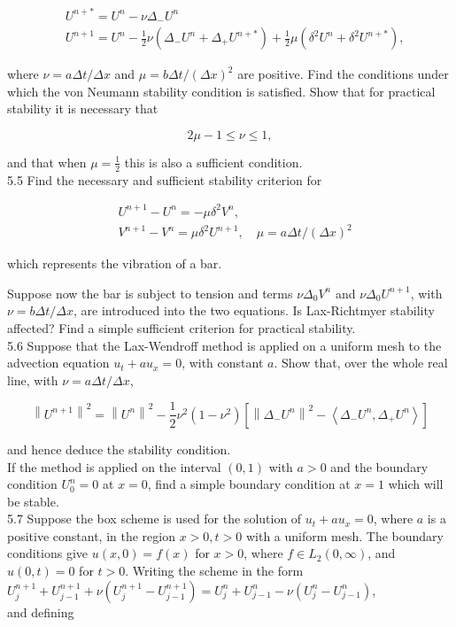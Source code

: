 \documentclass[10pt]{article}
\begin{document}
\[
\begin{aligned}
& U^{n+*}=U^{n}-\nu \Delta_{-} U^{n} \\
& U^{n+1}=U^{n}-\frac{1}{2} \nu\left(\Delta_{-} U^{n}+\Delta_{+} U^{n+*}\right)+\frac{1}{2} \mu\left(\delta^{2} U^{n}+\delta^{2} U^{n+*}\right),
\end{aligned}
\]

where \(\nu=a \Delta t / \Delta x\) and \(\mu=b \Delta t /(\Delta x)^{2}\) are positive. Find the conditions under which the von Neumann stability condition is satisfied. Show that for practical stability it is necessary that

\[
2 \mu-1 \leq \nu \leq 1,
\]

and that when \(\mu=\frac{1}{2}\) this is also a sufficient condition.\\
5.5 Find the necessary and sufficient stability criterion for

\[
\begin{aligned}
& U^{n+1}-U^{n}=-\mu \delta^{2} V^{n}, \\
& V^{n+1}-V^{n}=\mu \delta^{2} U^{n+1}, \quad \mu=a \Delta t /(\Delta x)^{2}
\end{aligned}
\]

which represents the vibration of a bar.

Suppose now the bar is subject to tension and terms \(\nu \Delta_{0} V^{n}\) and \(\nu \Delta_{0} U^{n+1}\), with \(\nu=b \Delta t / \Delta x\), are introduced into the two equations. Is Lax-Richtmyer stability affected? Find a simple sufficient criterion for practical stability.\\
5.6 Suppose that the Lax-Wendroff method is applied on a uniform mesh to the advection equation \(u_{t}+a u_{x}=0\), with constant \(a\). Show that, over the whole real line, with \(\nu=a \Delta t / \Delta x\),

\[
\left\|U^{n+1}\right\|^{2}=\left\|U^{n}\right\|^{2}-\frac{1}{2} \nu^{2}\left(1-\nu^{2}\right)\left[\left\|\Delta_{-} U^{n}\right\|^{2}-\left\langle\Delta_{-} U^{n}, \Delta_{+} U^{n}\right\rangle\right]
\]

and hence deduce the stability condition.\\
If the method is applied on the interval \((0,1)\) with \(a>0\) and the boundary condition \(U_{0}^{n}=0\) at \(x=0\), find a simple boundary condition at \(x=1\) which will be stable.\\
5.7 Suppose the box scheme is used for the solution of \(u_{t}+a u_{x}=0\), where \(a\) is a positive constant, in the region \(x>0, t>0\) with a uniform mesh. The boundary conditions give \(u(x, 0)=f(x)\) for \(x>0\), where \(f \in L_{2}(0, \infty)\), and \(u(0, t)=0\) for \(t>0\). Writing the scheme in the form\\
\(U_{j}^{n+1}+U_{j-1}^{n+1}+\nu\left(U_{j}^{n+1}-U_{j-1}^{n+1}\right)=U_{j}^{n}+U_{j-1}^{n}-\nu\left(U_{j}^{n}-U_{j-1}^{n}\right)\),\\
and defining
\end{document}

